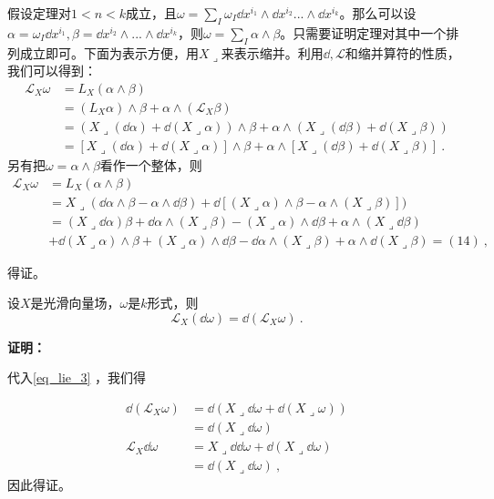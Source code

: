 假设定理对$1<n<k$成立，且$\omega=\sum_{I}\omega_I\dd x^{i_1}\wedge\dd x^{i_2}...\wedge \dd x^{i_k}$。那么可以设$\alpha=\omega_I\dd x^{i_1},\beta=\dd x^{i_2}\wedge...\wedge\dd x^{i_k}$，则$\omega=\sum_I\alpha\wedge\beta$。只需要证明定理对其中一个排列成立即可。下面为表示方便，用$X\lrcorner$来表示缩并。利用$\dd,\mathcal L$和缩并算符的性质，我们可以得到：
\begin{equation}
\begin{aligned}
\mathcal L_X\omega&=L_X(\alpha\wedge\beta)\\
&=(L_X\alpha)\wedge\beta+\alpha\wedge (\mathcal L_X\beta)\\
&=(X\lrcorner(\dd \alpha)+\dd (X\lrcorner\alpha))\wedge\beta+\alpha\wedge(X\lrcorner(\dd \beta)+\dd (X\lrcorner\beta))\\
&=[X\lrcorner(\dd \alpha)+\dd(X\lrcorner\alpha)]\wedge\beta+\alpha\wedge[X\lrcorner(\dd \beta)+\dd(X\lrcorner\beta)]~.
\end{aligned}
\end{equation}
另有把$\omega=\alpha\wedge\beta$看作一个整体，则
\begin{equation}
\begin{aligned}
\mathcal L_X\omega&=L_X(\alpha\wedge\beta)\\
&=X\lrcorner(\dd\alpha\wedge\beta-\alpha\wedge\dd\beta)+\dd[(X\lrcorner\alpha)\wedge\beta-\alpha\wedge(X\lrcorner\beta)])\\
&=(X\lrcorner\dd\alpha)\beta+\dd\alpha\wedge(X\lrcorner\beta)-(X\lrcorner\alpha)\wedge\dd\beta+\alpha\wedge(X\lrcorner\dd\beta)\\
&+\dd(X\lrcorner\alpha)\wedge\beta+(X\lrcorner\alpha)\wedge\dd\beta-\dd\alpha\wedge(X\lrcorner\beta)+\alpha\wedge\dd(X\lrcorner\beta)=(14)~,
\end{aligned}
\end{equation}

得证。

\begin{corollary}{}
设$X$是光滑向量场，$\omega$是$k$形式，则
\begin{equation}\label{eq_lie_4}
\mathcal L_X(\dd\omega)=\dd(\mathcal L_X\omega)~.
\end{equation}
\end{corollary}
\textbf{证明：}

代入\autoref{eq_lie_3} ，我们得

\begin{equation}
\begin{aligned}
\dd(\mathcal L_X\omega)&=\dd(X\lrcorner\dd\omega+\dd(X\lrcorner\omega))\\
&=\dd(X\lrcorner\dd\omega)\\
\mathcal L_X\dd \omega&=X\lrcorner\dd\dd\omega+\dd(X\lrcorner\dd\omega)\\
&=\dd(X\lrcorner\dd\omega)~,
\end{aligned}
\end{equation}
因此得证。

